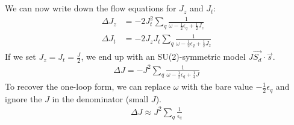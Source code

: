 \documentclass[twoside]{report}
\numberwithin{equation}{section}
\begin{document}
\\\\We can now write down the flow equations for \(J_z\) and \(J_t\):
\begin{equation}\begin{aligned}
	\Delta J_z &= - 2J_t^2 \sum_q \frac{1}{\omega - \frac{1}{2}\epsilon_q+ \frac{1}{2}J_z}\\
	\Delta J_t &= -2J_z J_t \sum_q\frac{1}{\omega - \frac{1}{2}\epsilon_q+ \frac{1}{2}J_z }
\end{aligned}\end{equation}
If we set \(J_z = J_t = \frac{J}{2}\), we end up with an SU(2)-symmetric model \(J \vec{S_d}\cdot\vec{s}\).
\begin{equation}\begin{aligned}
	\label{kondosym}
	\Delta J = - J^2 \sum_q \frac{1}{\omega - \frac{1}{2}\epsilon_q+ \frac{1}{4}J}
\end{aligned}\end{equation}
To recover the one-loop form, we can replace \(\omega\) with the bare value \(-\frac{1}{2}\epsilon_q\) and ignore the \(J\) in the denominator (small \(J\)).
\begin{equation}\begin{aligned}
	\Delta J \approx J^2 \sum_q \frac{1}{\epsilon_q}
\end{aligned}\end{equation}
\end{document}
